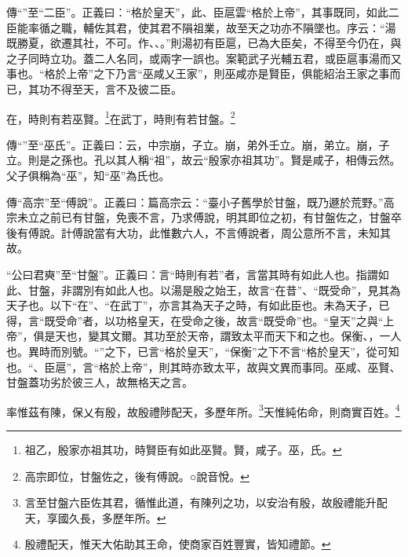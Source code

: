 {\noindent\zhuan{}\fzbyks 傳“”至“二臣”。正義曰：“格於皇天”，此、臣扈雲“格於上帝”，其事既同，如此二臣能率循之職，輔佐其君，使其君不隕祖業，故至天之功亦不隕墜也。序云：“湯既勝夏，欲遷其社，不可。作、、。”則湯初有臣扈，已為大臣矣，不得至今仍在，與之子同時立功。蓋二人名同，或兩字一誤也。案範武子光輔五君，或臣扈事湯而又事也。“格於上帝”之下乃言“巫咸乂王家”，則巫咸亦是賢臣，俱能紹治王家之事而已，其功不得至天，言不及彼二臣。 \par}

在，時則有若巫賢。\footnote{祖乙，殷家亦祖其功，時賢臣有如此巫賢。賢，咸子。巫，氏。}在武丁，時則有若甘盤。\footnote{高宗即位，甘盤佐之，後有傅說。○說音悅。}

{\noindent\zhuan{}\fzbyks 傳“”至“巫氏”。正義曰：云，中宗崩，子立。崩，弟外壬立。崩，弟立。崩，子立。則是之孫也。孔以其人稱“祖”，故云“殷家亦祖其功”。賢是咸子，相傳云然。父子俱稱為“巫”，知“巫”為氏也。 \par}

{\noindent\zhuan{}\fzbyks 傳“高宗”至“傅說”。正義曰：篇高宗云：“臺小子舊學於甘盤，既乃遯於荒野。”高宗未立之前已有甘盤，免喪不言，乃求傅說，明其即位之初，有甘盤佐之，甘盤卒後有傅說。計傅說當有大功，此惟數六人，不言傅說者，周公意所不言，未知其故。 \par}

{\noindent\shu{}\fzkt “公曰君奭”至“甘盤”。正義曰：言“時則有若”者，言當其時有如此人也。指謂如此、甘盤，非謂別有如此人也。以湯是殷之始王，故言“在昔”、“既受命”，見其為天子也。以下“在”、“在武丁”，亦言其為天子之時，有如此臣也。未為天子，已得，言“既受命”者，以功格皇天，在受命之後，故言“既受命”也。“皇天”之與“上帝”，俱是天也，變其文爾。其功至於天帝，謂致太平而天下和之也。保衡、，一人也。異時而別號。“”之下，已言“格於皇天”，“保衡”之下不言“格於皇天”，從可知也。“、臣扈”，言“格於上帝”，則其時亦致太平，故與文異而事同。巫咸、巫賢、甘盤蓋功劣於彼三人，故無格天之言。 \par}

率惟茲有陳，保乂有殷，故殷禮陟配天，多歷年所。\footnote{言至甘盤六臣佐其君，循惟此道，有陳列之功，以安治有殷，故殷禮能升配天，享國久長，多歷年所。}天惟純佑命，則商實百姓。\footnote{殷禮配天，惟天大佑助其王命，使商家百姓豐實，皆知禮節。}


